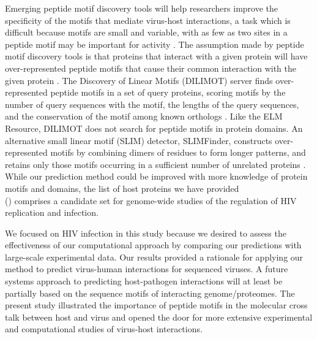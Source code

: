 Emerging peptide motif discovery tools will help researchers improve
the specificity of the motifs that mediate virus-host interactions, a
task which is difficult because motifs are small and variable, with as
few as two sites in a peptide motif may be important for activity
\cite{edwards07}. The assumption made by peptide motif discovery tools
is that proteins that interact with a given protein will have
over-represented peptide motifs that cause their common interaction
with the given protein \cite{tan06}. The Discovery of Linear Motifs
(DILIMOT) server finds over-represented peptide motifs in a set of
query proteins, scoring motifs by the number of query sequences with
the motif, the lengths of the query sequences, and the conservation of
the motif among known orthologs \cite{neduva06nuc}. Like the ELM
Resource, DILIMOT does not search for peptide motifs in protein
domains. An alternative small linear motif (SLIM) detector,
SLIMFinder, constructs over-represented motifs by combining dimers of
residues to form longer patterns, and retains only those motifs
occurring in a sufficient number of unrelated proteins
\cite{edwards07}. While our prediction method could be improved with
more knowledge of protein motifs and domains, the list of host
proteins we have provided
\\ ()
comprises a candidate set for genome-wide studies of the regulation of
HIV replication and infection.

We focused on HIV infection in this study because we desired to assess
the effectiveness of our computational approach by comparing our
predictions with large-scale experimental data. Our results provided a
rationale for applying our method to predict virus-human interactions
for sequenced viruses. A future systems approach to predicting
host-pathogen interactions will at least be partially based on the
sequence motifs of interacting genome/proteomes. The present study
illustrated the importance of peptide motifs in the molecular cross
talk between host and virus and opened the door for more extensive
experimental and computational studies of virus-host interactions.


